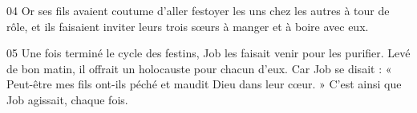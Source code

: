 
04 Or ses fils avaient coutume d’aller festoyer les uns chez les autres à tour de rôle, et ils faisaient inviter leurs trois sœurs à manger et à boire avec eux.

05 Une fois terminé le cycle des festins, Job les faisait venir pour les purifier. Levé de bon matin, il offrait un holocauste pour chacun d’eux. Car Job se disait : « Peut-être mes fils ont-ils péché et maudit Dieu dans leur cœur. » C’est ainsi que Job agissait, chaque fois.

